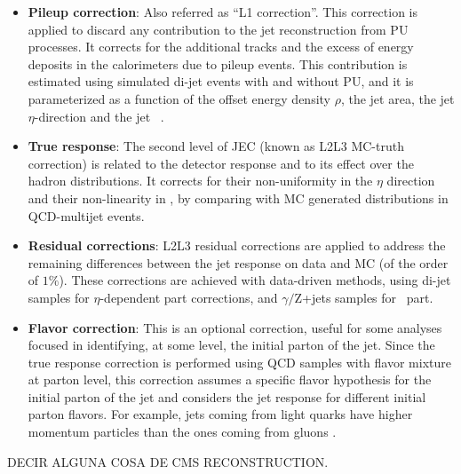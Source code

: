 \begin{itemize}
 \item \textbf{Pileup correction}: Also referred as ``L1 correction''. This correction is applied to discard any 
 contribution to the jet reconstruction from PU processes. It corrects for the additional tracks and 
 the excess of energy deposits in the calorimeters due to pileup events. This contribution 
 is estimated using simulated di-jet events with and without PU, and it is 
 parameterized as a function of the offset energy density $\rho$, the jet area, the jet $\eta$-direction 
 and the jet \pt~\cite{JECpileup}. 
 \item \textbf{True response}: The second level of JEC (known as L2L3 MC-truth correction) is related to 
 the detector response and to its effect over the hadron distributions. It corrects for their 
 non-uniformity in the $\eta$ direction and their non-linearity in \pt, by comparing with MC generated 
 distributions in QCD-multijet events. 
 \item \textbf{Residual corrections}: L2L3 residual corrections are applied to address 
 the remaining differences between the jet response on data and MC (of the order of $1 \%$). These corrections are 
achieved with data-driven methods, using di-jet samples for $\eta$-dependent part corrections,
and $\gamma /$Z+jets samples for \pt~part. 
 \item \textbf{Flavor correction}: This is an optional correction, useful for some analyses 
 focused in identifying, at some level, the initial parton of the jet. Since the true 
 response correction is performed using QCD samples with flavor mixture at parton level, this 
 correction assumes a specific flavor hypothesis for the initial parton of the jet and 
 considers the jet response for different initial parton flavors. For example, jets coming
 from light quarks have higher momentum particles than the ones coming from gluons \cite{JecJet}. 
\end{itemize}

DECIR ALGUNA COSA DE CMS RECONSTRUCTION.



